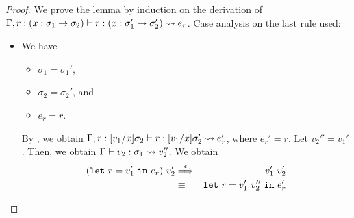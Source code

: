 \begin{proof}
We prove the lemma by induction on the derivation of \(\Gamma,r:(x:\sigma_1 \to \sigma_2) \vdash r : (x:\sigma_1' \to \sigma_2') \leadsto e_r\).
Case analysis on the last rule used:
\begin{itemize}

\item[] 
We have
\begin{itemize}
\item \(\sigma_1=\sigma_1'\),
\item \(\sigma_2=\sigma_2'\), and
\item \(e_r=r\).
\end{itemize}
By , we obtain
\(\Gamma,r:[v_1/x]\sigma_2 \vdash r : [v_1/x]\sigma_2' \leadsto e_r'\), where
\(e_r'=r\).
Let \(v_2''=v_1'\).
Then, we obtain \(\Gamma \vdash v_2 : \sigma_1 \leadsto v_2''\).
%
We obtain
\begin{eqnarray*}
(\mathtt{let~}r=v_1'\mathtt{~in~}{e_r})\ v_2'
&\stackrel{\epsilon}{\Longrightarrow}_{}& v_1'\ v_2' \\
&\equiv&
\mathtt{let~}r=v_1'\ v_2''\mathtt{~in~}e_r'
\end{eqnarray*}


\end{itemize}
\end{proof}

